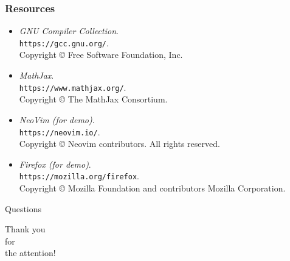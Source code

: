 \documentclass[12pt]{beamer}
\begin{document}
	\begin{frame}
	\frametitle{Resources}
		\begin{itemize}
			
			\item
			
				{\itshape GNU Compiler Collection}.\\ \texttt{https://gcc.gnu.org/}.\\ 
				Copyright \copyright{} Free Software Foundation, Inc.
			
			\item
			
				{\itshape MathJax}. \\ 
				\texttt{https://www.mathjax.org/}.\\
				Copyright \copyright{} The MathJax Consortium.
			
			\item
			
				{\itshape NeoVim (for demo)}. \\ 
				\texttt{https://neovim.io/}.\\
				Copyright \copyright\; Neovim contributors. All rights reserved.
			
			\item
			
				{\itshape Firefox (for demo)}. \\ 
				\texttt{https://mozilla.org/firefox}.\\
				Copyright \copyright\; Mozilla Foundation and contributors Mozilla Corporation.
			
		\end{itemize}
	\end{frame}
	
	\begin{frame}
		\begin{center}
			{\Huge Questions}
		\end{center}
	\end{frame}
	
	\begin{frame}
		\begin{center}
			{\Huge Thank you\\for\\the attention!}
		\end{center}
	\end{frame}
\end{document}
